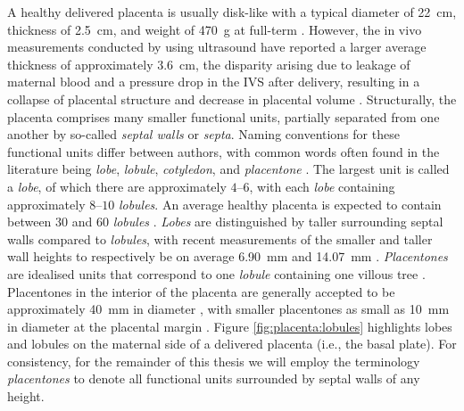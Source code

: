         A healthy delivered placenta is usually disk-like with a typical diameter of \qty{22}{\centi\meter}, thickness of \qty{2.5}{\centi\meter}, and weight of \qty{470}{\gram} at full-term \cite{benirschkePathologyHumanPlacenta2012}. However, the in vivo measurements conducted by \citeauthor{afrakhtehCorrelationPlacentalThickness2013} \cite{afrakhtehCorrelationPlacentalThickness2013} using ultrasound have reported a larger average thickness of approximately \qty{3.6}{\centi\meter}, the disparity arising due to leakage of maternal blood and a pressure drop in the IVS after delivery, resulting in a collapse of placental structure and decrease in placental volume \cite{lecarpentierComputationalFluidDynamic2016,afrakhtehCorrelationPlacentalThickness2013}. Structurally, the placenta comprises many smaller functional units, partially separated from one another by so-called \textit{septal walls} or \textit{septa}. Naming conventions for these functional units differ between authors, with common words often found in the literature being \textit{lobe}, \textit{lobule}, \textit{cotyledon}, and \textit{placentone} \cite{kaufmannPlacentalVascularizationBlood1988}. The largest unit is called a \textit{lobe}, of which there are approximately $4$--$6$, with each \textit{lobe} containing approximately $8$--$10$ \textit{lobules}. An average healthy placenta is expected to contain between $30$ and $60$ \textit{lobules} \cite{serovRoleMorphologyMathematical2016,benirschkePathologyHumanPlacenta2012,kaufmannPlacentalVascularizationBlood1988}. \textit{Lobes} are distinguished by taller surrounding septal walls compared to \textit{lobules}, with recent measurements of the smaller and taller wall heights to respectively be on average \qty{6.90}{\milli\meter} and \qty{14.07}{\milli\meter} \cite{AMANITIS2023e68}. \textit{Placentones} are idealised units that correspond to one \textit{lobule} containing one villous tree \cite{kaufmannPlacentalVascularizationBlood1988,jensenBloodFlowTransport2019}. Placentones in the interior of the placenta are generally accepted to be approximately \qty{40}{\milli\meter} in diameter \cite{chernyavskyMathematicalModelIntervillous2010,lecarpentierComputationalFluidDynamic2016}, with smaller placentones as small as \qty{10}{\milli\meter} in diameter at the placental margin \cite{benirschkePathologyHumanPlacenta2012}. Figure \ref{fig:placenta:lobules} highlights lobes and lobules on the maternal side of a delivered placenta (i.e., the basal plate). For consistency, for the remainder of this thesis we will employ the terminology \textit{placentones} to denote all functional units surrounded by septal walls of any height.

